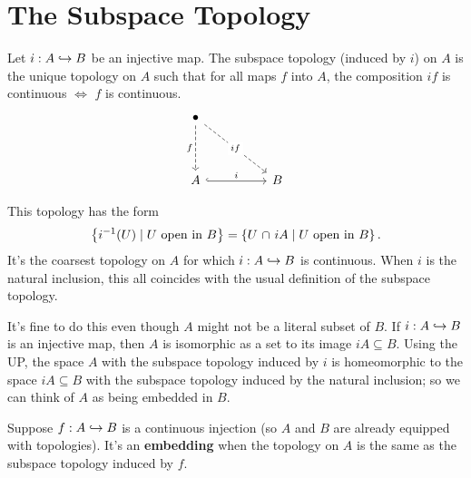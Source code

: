 \documentclass[twoside,10pt]{report}
\begin{document}
\section{The Subspace Topology}

\begin{prop}
	Let $i:A \hookrightarrow B$ be an injective map. The subspace topology (induced by $i$) on $A$ is the unique topology on $A$ such that for all maps $f$ into $A$, the composition $if$ is continuous $\iff$ $f$ is continuous.
\[\begin{tikzcd}
	\bullet \\
	\\
	A && B
	\arrow["i", hook, from=3-1, to=3-3]
	\arrow["{ f}"', dashed, from=1-1, to=3-1]
	\arrow["if"{description}, dashed, from=1-1, to=3-3]
\end{tikzcd}\]
\end{prop}
This topology has the form
\[
\left\{ i^{-1}(U) \;|\; U \text{ open in } B  \right\} = \left\{ U \operatorname{\,\cap\,} iA \;|\; U \text{ open in } B \right\}.
\]
It's the coarsest topology on $A$ for which $i: A \hookrightarrow B$ is continuous. When $i$ is the natural inclusion, this all coincides with the usual definition of the subspace topology.


It's fine to do this even though $A$ might not be a literal subset of $B$. If $i: A \hookrightarrow B$ is an injective map, then $A$ is isomorphic as a set to its image $iA \subseteq B$. Using the UP, the space $A$ with the subspace topology induced by $i$ is homeomorphic to the space $iA \subseteq B$ with the subspace topology induced by the natural inclusion; so we can think of $A$ as being embedded in $B$.

\begin{defn}[]
Suppose $f: A \hookrightarrow B$ is a continuous injection (so $A$ and $B$ are already equipped with topologies). It's an \textbf{embedding} when the topology on $A$ is the same as the subspace topology induced by $f$.
\end{defn}

\end{document}
